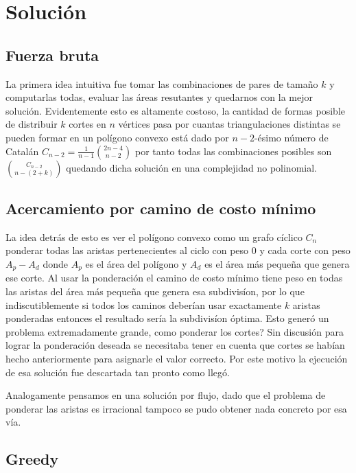 \documentclass{article}
\begin{document}
\newpage
\section{Soluci\'{o}n}
\subsection{Fuerza bruta}


La primera idea intuitiva fue tomar las combinaciones de pares de tama\~{n}o $k$ y computarlas todas, evaluar las \'{a}reas resutantes y quedarnos con la mejor soluci\'{o}n. Evidentemente esto es altamente costoso, la cantidad de formas posible de distribuir $k$ cortes en $n$ v\'{e}rtices pasa por cuantas triangulaciones distintas se pueden formar en un pol\'{i}gono convexo est\'{a} dado por $n-2$-\'{e}simo n\'{u}mero de Catal\'{a}n $C_{n-2} = \frac{1}{n-1}\binom{2n-4}{n-2}$ por tanto todas las combinaciones posibles son $\binom{C_{n-2}}{n-(2+k)}$ quedando dicha soluci\'{o}n en una complejidad no polinomial.


\subsection{Acercamiento por camino de costo m\'{i}nimo}


La idea detr\'{a}s de esto es ver el pol\'{i}gono convexo como un grafo c\'{i}clico $C_n$ ponderar todas las aristas pertenecientes al ciclo con peso $0$ y cada corte con peso $A_p - A_d$ donde $A_p$ es el \'{a}rea del pol\'{i}gono y $A_d$ es el \'{a}rea m\'{a}s peque\~{n}a que genera ese corte. Al usar la ponderaci\'{o}n el camino de costo m\'{i}nimo tiene peso en todas las aristas del \'{a}rea m\'{a}s peque\~{n}a que genera esa subdivis\'{i}on, por lo que indiscutiblemente si todos los caminos deber\'{i}an usar exactamente $k$ aristas ponderadas entonces el resultado ser\'{i}a la subdivis\'{i}on \'{o}ptima. Esto gener\'{o} un problema extremadamente grande, como ponderar los cortes? Sin discusi\'{o}n para lograr la ponderaci\'{o}n deseada se necesitaba tener en cuenta que cortes se hab\'{i}an hecho anteriormente para asignarle el valor correcto. Por este motivo la ejecuci\'{o}n de esa soluci\'{o}n fue descartada tan pronto como lleg\'{o}.


Analogamente pensamos en una soluci\'{o}n por flujo, dado que el problema de ponderar las aristas es irracional tampoco se pudo obtener nada concreto por esa v\'{i}a.


\subsection{Greedy}
\end{document}
